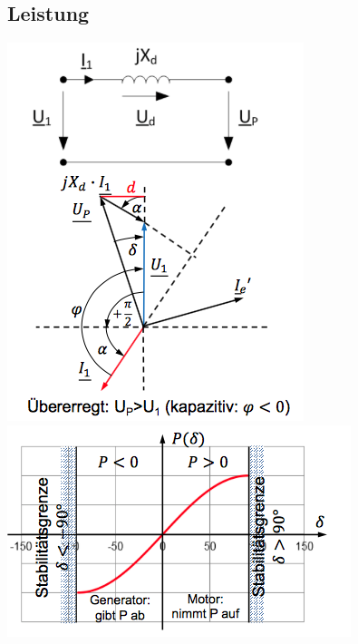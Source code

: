 \subsection{Leistung}
\begin{minipage}{0.25 \linewidth}
\includegraphics[width =  \linewidth]{./Pics/VL910/Leistung}\\
\includegraphics[width =  \linewidth]{./Pics/VL910/Leistung2}
\end{minipage}
